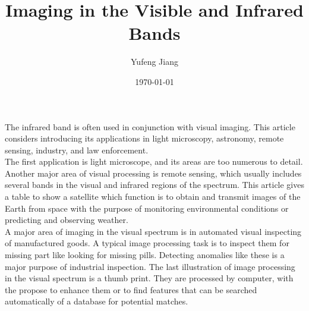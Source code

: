 \documentclass[11pt,oneside]{article}
\title{Imaging in the Visible and Infrared Bands}
\author{Yufeng Jiang}
\date{\today}
\begin{document}
\maketitle
The infrared band is often used in conjunction with visual imaging. This article considers introducing its applications in light microscopy, astronomy, remote sensing, industry, and law enforcement.\\
\indent The first application is light microscope, and its areas are too numerous to detail. Another major area of visual processing is remote sensing, which usually includes several bands in the visual and infrared regions of the spectrum. This article gives a table to show a satellite which function is to obtain and transmit images of the Earth from space with the purpose of monitoring environmental conditions or predicting and observing weather. \\
\indent A major area of imaging in the visual spectrum is in automated visual inspecting of manufactured goods. A typical image processing task is to inspect them for missing part like looking for missing pills. Detecting anomalies like these is a major purpose of industrial inspection. The last illustration of image processing in the visual spectrum is a thumb print. They are processed by computer, with the propose to enhance them or to find features that can be searched automatically of a database for potential matches. \\
\end{document}

